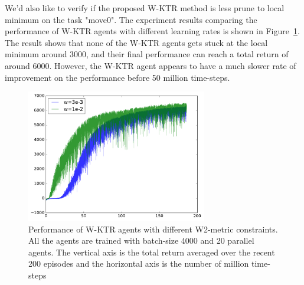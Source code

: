 We'd also like to verify if the proposed W-KTR method is less prune to local minimum on the task "move0". The experiment results comparing the performance of W-KTR agents with different learning rates is shown in Figure~\ref{fig_wass_const_tune}. The result shows that none of the W-KTR agents gets stuck at the local minimum around 3000, and their final performance can reach a total return of around 6000. However, the W-KTR agent appears to have a much slower rate of improvement on the performance before 50 million time-steps.
\begin{figure}[!htbp]
	\includegraphics[width=0.7\textwidth]{images/rec_wass_const_tune}
	\centering
	\caption{Performance of W-KTR agents with different W2-metric constraints. All the agents are trained with batch-size 4000 and 20 parallel agents. The vertical axis is the total return averaged over the recent 200 episodes and the horizontal axis is the number of million time-steps}\label{fig_wass_const_tune}
\end{figure}

